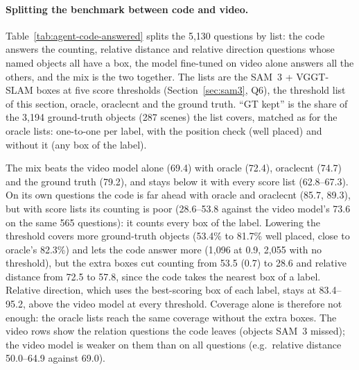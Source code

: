 \paragraph{Splitting the benchmark between code and video.}
Table~\ref{tab:agent-code-answered} splits the 5,130 questions by list: the code answers the counting, relative
distance and relative direction questions whose named objects all have a box, the model fine-tuned on video alone answers
all the others, and the mix is the two together. The lists are the SAM~3 + VGGT-SLAM boxes at five score thresholds
(Section~\ref{sec:sam3}, Q6), the threshold list of this section, oracle, oraclecnt and the ground truth. ``GT kept'' is
the share of the 3,194 ground-truth objects (287 scenes) the list covers, matched as for the oracle lists: one-to-one per
label, with the position check (well placed) and without it (any box of the label).

The mix beats the video model alone (69.4) with oracle (72.4), oraclecnt (74.7) and the ground truth (79.2), and stays
below it with every score list (62.8--67.3). On its own questions the code is far ahead with oracle and oraclecnt (85.7,
89.3), but with score lists its counting is poor (28.6--53.8 against the video model's 73.6 on the same 565 questions):
it counts every box of the label. Lowering the threshold covers more ground-truth objects (53.4\% to 81.7\% well placed,
close to oracle's 82.3\%) and lets the code answer more (1,096 at 0.9, 2,055 with no threshold), but the extra boxes cut
counting from 53.5 (0.7) to 28.6 and relative distance from 72.5 to 57.8, since the code takes the nearest box of a label.
Relative direction, which uses the best-scoring box of each label, stays at 83.4--95.2, above the video model at every
threshold. Coverage alone is therefore not enough: the oracle lists reach the same coverage without the extra boxes. The
video rows show the relation questions the code leaves (objects SAM~3 missed); the video model is weaker on them than on
all questions (e.g.\ relative distance 50.0--64.9 against 69.0).

